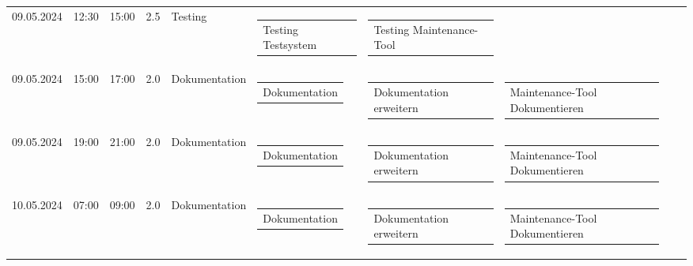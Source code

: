 {\begin{longtable}[H]{lllrllllll}
09.05.2024 & 12:30 & 15:00 & 2.5 & Testing & \begin{tabular}[c]{@{}l@{}}Testing Testsystem\end{tabular} & \begin{tabular}[c]{@{}l@{}}Testing Maintenance-Tool\end{tabular} & \begin{tabular}[c]{@{}l@{}}\end{tabular} & \begin{tabular}[c]{@{}l@{}}\end{tabular} & \begin{tabular}[c]{@{}l@{}}\end{tabular} \\
09.05.2024 & 15:00 & 17:00 & 2.0 & Dokumentation & \begin{tabular}[c]{@{}l@{}}Dokumentation\end{tabular} & \begin{tabular}[c]{@{}l@{}}Dokumentation erweitern\end{tabular} & \begin{tabular}[c]{@{}l@{}}Maintenance-Tool Dokumentieren\end{tabular} & \begin{tabular}[c]{@{}l@{}}\end{tabular} & \begin{tabular}[c]{@{}l@{}}\end{tabular} \\
09.05.2024 & 19:00 & 21:00 & 2.0 & Dokumentation & \begin{tabular}[c]{@{}l@{}}Dokumentation\end{tabular} & \begin{tabular}[c]{@{}l@{}}Dokumentation erweitern\end{tabular} & \begin{tabular}[c]{@{}l@{}}Maintenance-Tool Dokumentieren\end{tabular} & \begin{tabular}[c]{@{}l@{}}\end{tabular} & \begin{tabular}[c]{@{}l@{}}\end{tabular} \\
10.05.2024 & 07:00 & 09:00 & 2.0 & Dokumentation & \begin{tabular}[c]{@{}l@{}}Dokumentation\end{tabular} & \begin{tabular}[c]{@{}l@{}}Dokumentation erweitern\end{tabular} & \begin{tabular}[c]{@{}l@{}}Maintenance-Tool Dokumentieren\end{tabular} & \begin{tabular}[c]{@{}l@{}}\end{tabular} & \begin{tabular}[c]{@{}l@{}}\end{tabular} \\

\end{longtable}}
